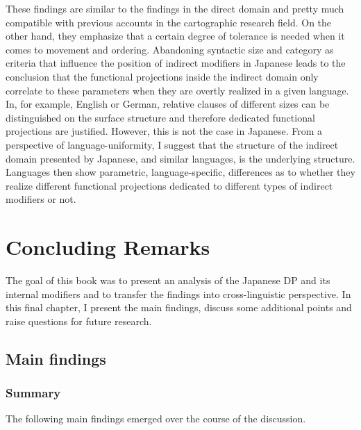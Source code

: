 \documentclass [output=book,colorlinks,citecolor=brown]{langscibook}
\begin{document}
These findings are similar to the findings in the direct domain and pretty much compatible with previous accounts in the cartographic research field. On the other hand, they emphasize that a certain degree of tolerance is needed when it comes to movement and ordering. Abandoning syntactic size and category as criteria that influence the position of indirect modifiers in Japanese leads to the conclusion that the functional projections inside the indirect domain only correlate to these parameters when they are overtly realized in a given language. In, for example, English or German, relative clauses of different sizes can be distinguished on the surface structure and therefore dedicated functional projections are justified. However, this is not the case in Japanese. From a perspective of language-uniformity, I suggest that the structure of the indirect domain presented by Japanese, and similar languages, is the underlying structure. Languages then show parametric, language-specific, differences as to whether they realize different functional projections dedicated to different types of indirect modifiers or not.

\chapter{Concluding Remarks} \label{concluding}

The goal of this book was to present an analysis of the Japanese DP and its internal modifiers and to transfer the findings into cross-linguistic perspective. In this final chapter, I present the main findings, discuss some additional points and raise questions for future research.

\section{Main findings}

\subsection{Summary}

The following main findings emerged over the course of the discussion.
\end{document}
